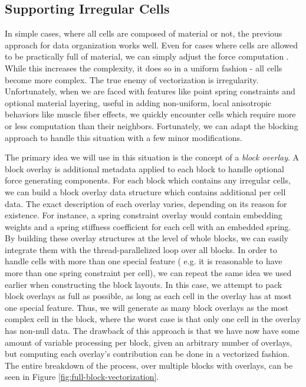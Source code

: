 \subsection{Supporting Irregular Cells}

In simple cases, where all cells are composed of material or not, the
previous approach for data organization works well. Even for cases
where cells are allowed to be practically full of material, we can
simply adjust the force computation \citep{PatteMS:2012}. While this
increases the complexity, it does so in a uniform fashion - all cells
become more complex. The true enemy of vectorization is
irregularity. Unfortunately, when we are faced with features like
point spring constraints and optional material layering, useful in
adding non-uniform, local anisotropic behaviors like muscle fiber
effects, we quickly encounter cells which require more or less
computation than their neighbors. Fortunately, we can adapt the
blocking approach to handle this situation with a few minor
modifications.

The primary idea we will use in this situation is the concept of a
\textit{block overlay}. A block overlay is additional metadata applied
to each block to handle optional force generating components. For each
block which contains any irregular cells, we can build a block overlay
data structure which contains additional per cell data. The exact
description of each overlay varies, depending on its reason for
existence. For instance, a spring constraint overlay would contain
embedding weights and a spring stiffness coefficient for each cell
with an embedded spring. By building these overlay structures at the
level of whole blocks, we can easily integrate them with the
thread-parallelized loop over all blocks. In order to handle cells
with more than one special feature ( e.g. it is reasonable to have
more than one spring constraint per cell), we can repeat the same idea
we used earlier when constructing the block layouts. In this case, we
attempt to pack block overlays as full as possible, as long as each
cell in the overlay has at most one special feature. Thus, we will
generate as many block overlays as the most complex cell in the block,
where the worst case is that only one cell in the overlay has non-null
data. The drawback of this approach is that we have now have some
amount of variable processing per block, given an arbitrary number of
overlays, but computing each overlay's contribution can be done in a
vectorized fashion. The entire breakdown of the process, over multiple
blocks with overlays, can be seen in Figure \ref{fig:full-block-vectorization}.

